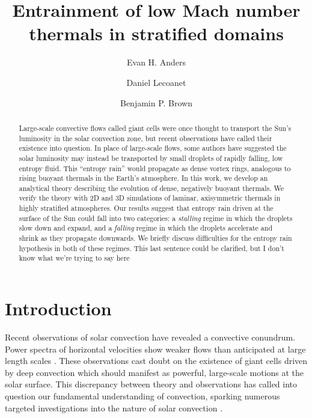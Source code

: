 \documentclass[twocolumn, amsmath, amsfonts, amssymb, trackchanges]{aastex62}
\newcommand{\dl}[1]{{\color{blue} #1}}
\begin{document}
\title{Entrainment of low Mach number thermals in stratified domains}


\author[0000-0002-3433-4733]{Evan H. Anders}
\author[0000-0002-7635-9728]{Daniel Lecoanet}
\author[0000-0001-8935-219X]{Benjamin P. Brown}


\begin{abstract}
Large-scale convective flows called giant cells were once thought to transport the Sun's luminosity in the solar convection zone, but recent observations have called their existence into question.
In place of large-scale flows, some authors have suggested the solar luminosity may instead be transported by small droplets of rapidly falling, low entropy fluid.
This ``entropy rain'' would propagate as dense vortex rings, analogous to rising buoyant thermals in the Earth's atmosphere.
In this work, we develop an analytical theory describing the evolution of dense, negatively buoyant thermals.
We verify the theory with 2D and 3D simulations of laminar, axisymmetric thermals in highly stratified atmospheres.
Our results suggest that entropy rain driven at the surface of the Sun could fall into two categories: a \emph{stalling} regime in which the droplets slow down and expand, and a \emph{falling} regime in which the droplets accelerate and shrink as they propagate downwards.
We briefly discuss difficulties for the entropy rain hypothesis in both of these regimes. \dl{This last sentence could be clarified, but I don't know what we're trying to say here}
\end{abstract}


\section{Introduction}
\label{sec:intro}
Recent observations of solar convection have revealed a convective conundrum.
Power spectra of horizontal velocities show weaker flows than anticipated at large length scales \citep{hanasoge&all2012, greer&all2015}.
These observations cast doubt on the existence of giant cells driven by deep convection which should manifest as powerful, large-scale motions at the solar surface. 
This discrepancy between theory and observations has called into question our fundamental understanding of convection, sparking numerous targeted investigations into the nature of solar convection  \citep{featherstone&hindman2016, omara&all2016, cossette&rast2016, kapyla&all2017, hotta2017}.
\end{document}
